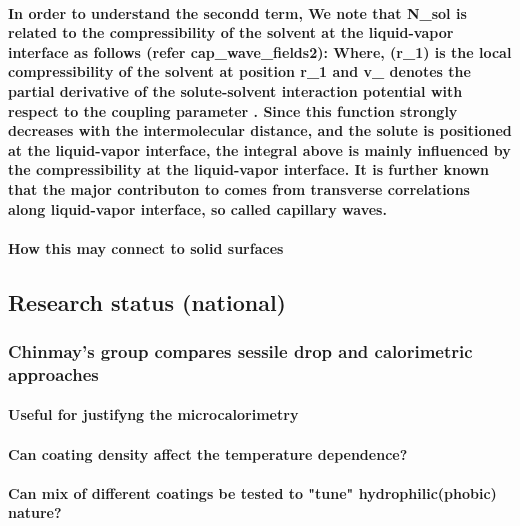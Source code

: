 \documentclass[a4paper,12pt,single,pdftex]{scrartcl}
\begin{document}
\label{ID_1103070320}\paragraph{In order to understand the secondd term, We note that \Delta N_{sol} is related to the compressibility of the solvent at the liquid-vapor interface as follows (refer cap_wave_fields2): Where, \chi (r_1) is the local compressibility of the solvent at position r_1 and v_{\Psi} denotes the partial derivative of the solute-solvent interaction potential with respect to the coupling parameter \lambda. Since this function strongly decreases with the intermolecular distance, and the solute is positioned at the liquid-vapor interface, the integral above is mainly influenced by the compressibility at the liquid-vapor interface. It is further known that the major contributon to \chi comes from transverse correlations along liquid-vapor interface, so called capillary waves.}

\label{ID_276381896}\paragraph{How this may connect to solid surfaces}

\label{ID_374576713}\subsection{Research status (national)}

\label{ID_135785427}\subsubsection{Chinmay's group compares sessile drop and calorimetric approaches}

\label{ID_1532965186}\paragraph{Useful for justifyng the microcalorimetry}

\label{ID_838488932}\paragraph{Can coating density affect the temperature dependence?}

\label{ID_1401479645}\paragraph{Can mix of different coatings be tested to "tune" hydrophilic(phobic) nature?}
\end{document}

